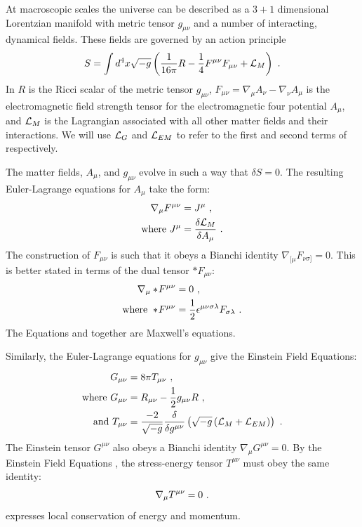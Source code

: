 At macroscopic scales the universe can be described as a $3+1$ dimensional Lorentzian manifold with metric tensor $g_{\mu\nu}$ and a number of interacting, dynamical fields.  These fields are governed by an action principle
\begin{equation}
	S = \int d^4x \sqrt{-g} \left( \frac{1}{16\pi} R - \frac{1}{4}F^{\mu\nu}F_{\mu\nu}  + \LL_M\right)\ . \eqlabel{action}
\end{equation}
In  $R$ is the Ricci scalar of the metric tensor $g_{\mu\nu}$, $F_{\mu\nu} = \nabla_\mu A_\nu - \nabla_\nu A_\mu$ is the electromagnetic field strength tensor for the electromagnetic four potential $A_\mu$, and $\mathcal{L}_M$ is the Lagrangian associated with all other matter fields and their interactions.  We will use $\mathcal{L}_G$ and $\mathcal{L}_{EM}$ to refer to the first and second terms of  respectively.

  The matter fields, $A_\mu$, and $g_{\mu\nu}$ evolve in such a way that $\delta S = 0$.  The resulting Euler-Lagrange equations for $A_\mu$ take the form:
  \begin{align}
  	\nabla_\mu F^{\mu\nu} &= J^\mu \eqlabel{maxwell1} \ , \\
	\text{where } J^\mu &= \frac{\delta \LL_M}{\delta A_\mu}\ .
   \end{align}
   The construction of $F_{\mu\nu}$ is such that it obeys a Bianchi identity $\nabla_{[\mu}F_{\nu\sigma]} = 0$.  This is better stated in terms of the dual tensor $*F_{\mu\nu}$:
     \begin{align}
  	\nabla_\mu *\! F^{\mu\nu} &= 0 \eqlabel{maxwell2} \ , \\
	\text{where } *\! F^{\mu\nu} &= \frac{1}{2}\epsilon^{\mu\nu\sigma\lambda}F_{\sigma\lambda} \ .
   \end{align}
   The Equations  and  together are Maxwell's equations.
   
   Similarly, the Euler-Lagrange equations for $g_{\mu\nu}$ give the Einstein Field Equations:
  \begin{align}
	G_{\mu\nu} &= 8\pi T_{\mu\nu} \eqlabel{einstein} \ , \\
	\text{where } G_{\mu\nu} &= R_{\mu\nu} - \frac{1}{2}g_{\mu\nu} R \ , \\
	\text{and } T_{\mu\nu} &= \frac{-2}{\sqrt{-g}} \frac{\delta}{\delta g^{\mu\nu}}\left(\sqrt{-g}\left( \LL_M + \LL_{EM} \right)\right) \ . \eqlabel{defTmunu}
   \end{align} 
   The Einstein tensor $G^{\mu\nu}$ also obeys a Bianchi identity $\nabla_\mu G^{\mu\nu}=0$. By the Einstein Field Equations , the stress-energy tensor $T^{\mu\nu}$ must obey the same identity:
   \begin{equation}
   	\nabla_\mu T^{\mu\nu} = 0 \eqlabel{consSE}\ .
   \end{equation}  
    expresses local conservation of energy and momentum.
   
